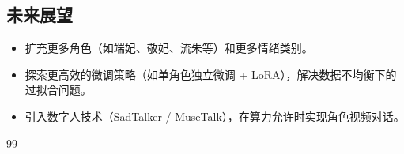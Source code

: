 \documentclass[12pt,a4paper]{article}
\begin{document}
\subsection{未来展望}

\begin{itemize}[leftmargin=*]
    \item 扩充更多角色（如端妃、敬妃、流朱等）和更多情绪类别。
    \item 探索更高效的微调策略（如单角色独立微调 + LoRA），解决数据不均衡下的过拟合问题。
    \item 引入数字人技术（SadTalker / MuseTalk），在算力允许时实现角色视频对话。
\end{itemize}

\newpage
{}
{}

\begin{thebibliography}{99}

%

\end{thebibliography}

\newpage
{}
{}
\end{document}
